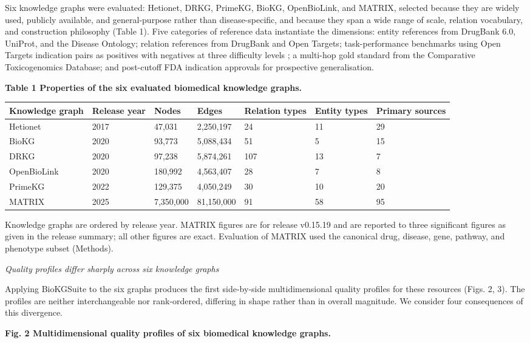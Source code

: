 Six knowledge graphs were evaluated: Hetionet, DRKG, PrimeKG, BioKG, OpenBioLink, and MATRIX, selected because they are widely used, publicly available, and general-purpose rather than disease-specific, and because they span a wide range of scale, relation vocabulary, and construction philosophy (Table 1). Five categories of reference data instantiate the dimensions: entity references from DrugBank 6.0, UniProt, and the Disease Ontology; relation references from DrugBank and Open Targets; task-performance benchmarks using Open Targets indication pairs as positives with negatives at three difficulty levels \cite{kotnis2017}; a multi-hop gold standard from the Comparative Toxicogenomics Database; and post-cutoff FDA indication approvals for prospective generalisation.

\textbf{Table 1 \textbar{} Properties of the six evaluated biomedical knowledge graphs.}

\begin{longtable}[]{@{}lllllll@{}}
\toprule
\textbf{Knowledge graph} & \textbf{Release year} & \textbf{Nodes} & \textbf{Edges} & \textbf{Relation types} & \textbf{Entity types} & \textbf{Primary sources}\tabularnewline
\midrule
\endhead
Hetionet & 2017 & 47,031 & 2,250,197 & 24 & 11 & 29\tabularnewline
BioKG & 2020 & 93,773 & 5,088,434 & 51 & 5 & 15\tabularnewline
DRKG & 2020 & 97,238 & 5,874,261 & 107 & 13 & 7\tabularnewline
OpenBioLink & 2020 & 180,992 & 4,563,407 & 28 & 7 & 8\tabularnewline
PrimeKG & 2022 & 129,375 & 4,050,249 & 30 & 10 & 20\tabularnewline
MATRIX & 2025 & 7,350,000 & 81,150,000 & 91 & 58 & 95\tabularnewline
\bottomrule
\end{longtable}

Knowledge graphs are ordered by release year. MATRIX figures are for release v0.15.19 and are reported to three significant figures as given in the release summary; all other figures are exact. Evaluation of MATRIX used the canonical drug, disease, gene, pathway, and phenotype subset (Methods).

\emph{Quality profiles differ sharply across six knowledge graphs}

Applying BioKGSuite to the six graphs produces the first side-by-side multidimensional quality profiles for these resources (Figs. 2, 3). The profiles are neither interchangeable nor rank-ordered, differing in shape rather than in overall magnitude. We consider four consequences of this divergence.

\textbf{Fig. 2 \textbar{} Multidimensional quality profiles of six biomedical knowledge graphs.}

